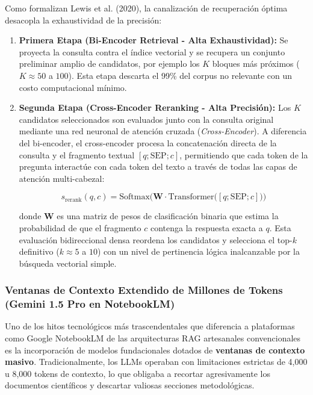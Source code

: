 Como formalizan Lewis et al. (2020), la canalización de recuperación óptima desacopla la exhaustividad de la precisión:

\begin{enumerate}
    \item \textbf{Primera Etapa (Bi-Encoder Retrieval - Alta Exhaustividad):} Se proyecta la consulta contra el índice vectorial y se recupera un conjunto preliminar amplio de candidatos, por ejemplo los $K$ bloques más próximos ($K \approx 50$ a $100$). Esta etapa descarta el 99\% del corpus no relevante con un costo computacional mínimo.
    \item \textbf{Segunda Etapa (Cross-Encoder Reranking - Alta Precisión):} Los $K$ candidatos seleccionados son evaluados junto con la consulta original mediante una red neuronal de atención cruzada (\textit{Cross-Encoder}). A diferencia del bi-encoder, el cross-encoder procesa la concatenación directa de la consulta y el fragmento textual $[q; \mathrm{SEP}; c]$, permitiendo que cada token de la pregunta interactúe con cada token del texto a través de todas las capas de atención multi-cabezal:
    
    \begin{equation}
    s_{\mathrm{rerank}}(q, c) = \mathrm{Softmax}\Big(\mathbf{W} \cdot \mathrm{Transformer}\big([q; \mathrm{SEP}; c]\big)\Big)
    \end{equation}
    
    donde $\mathbf{W}$ es una matriz de pesos de clasificación binaria que estima la probabilidad de que el fragmento $c$ contenga la respuesta exacta a $q$. Esta evaluación bidireccional densa reordena los candidatos y selecciona el top-$k$ definitivo ($k \approx 5$ a $10$) con un nivel de pertinencia lógica inalcanzable por la búsqueda vectorial simple.
\end{enumerate}

\subsubsection{Ventanas de Contexto Extendido de Millones de Tokens (Gemini 1.5 Pro en NotebookLM)}

Uno de los hitos tecnológicos más trascendentales que diferencia a plataformas como Google NotebookLM de las arquitecturas RAG artesanales convencionales es la incorporación de modelos fundacionales dotados de \textbf{ventanas de contexto masivo}. Tradicionalmente, los LLMs operaban con limitaciones estrictas de 4,000 u 8,000 tokens de contexto, lo que obligaba a recortar agresivamente los documentos científicos y descartar valiosas secciones metodológicas.


